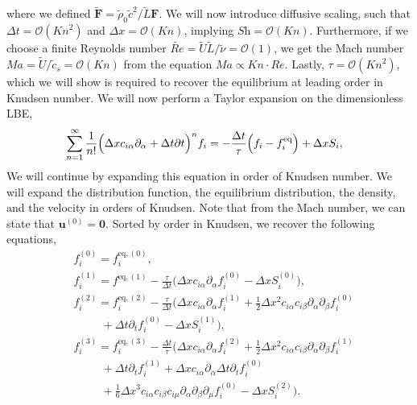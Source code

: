\documentclass[aps,physrev,twocolumn,10pt]{revtex4-2}
\begin{document}
where we defined $\tilde{\bm{F}} = \tilde{\rho}_0 \tilde{c}^2 / \tilde{L} \bm{F}$. We will now introduce diffusive scaling, such that $\Delta t = \mathcal{O}\left(\textit{Kn}^2\right)$ and $\Delta x = \mathcal{O}\left(\textit{Kn}\right)$, implying $\textit{Sh} = \mathcal{O}\left(\textit{Kn}\right)$. Furthermore, if we choose a finite Reynolds number $\tilde{Re} = \tilde{U} \tilde{L} / \tilde{\nu} = \mathcal{O}\left(1\right)$, we get the Mach number $\textit{Ma} = \tilde{U} / \tilde{c}_s = \mathcal{O}\left(\textit{Kn}\right)$ from the equation $\textit{Ma} \propto \textit{Kn}\cdot \textit{Re}$. Lastly, $\tau = \mathcal{O}\left(\textit{Kn}^2\right)$, which we will show is required to recover the equilibrium at leading order in Knudsen number. We will now perform a Taylor expansion on the dimensionless LBE,
\begin{equation}\label{eq:Taylor expansion LBE}
\begin{split}
    &\sum_{n=1}^\infty \frac{1}{n!}\Bigl(\Delta x c_{i\alpha} \partial_\alpha + \Delta t \partial t\Bigr)^n f_i=-\frac{\Delta t}{\tau}\Bigl(f_i  - f^\text{eq}_i\Bigr) + \Delta xS_i,
\end{split}
\end{equation}
We will continue by expanding this equation in order of Knudsen number. We will expand the distribution function, the equilibrium distribution, the density, and the velocity in orders of Knudsen. Note that from the Mach number, we can state that $\bm{u}^{(0)} = \bm{0}$. Sorted by order in Knudsen, we recover the following equations,
\begin{equation}\label{eq:asymptotic expansion lbe}
\begin{split}
    &f_i^{(0)} = f_i^{\text{eq},(0)},\\
    &f_i^{(1)} = f^{\text{eq},(1)} - \frac{\tau}{\Delta t}\Biggl(\Delta x c_{i\alpha}\partial_\alpha f_i^{(0)}-\Delta xS_i^{(0)}\Biggr),\\
    &f_i^{(2)} = f^{\text{eq},(2)}_i - \frac{\tau}{\Delta t}\Biggl(\Delta x c_{i\alpha}\partial_\alpha f_i^{(1)} + \frac{1}{2}\Delta x^2 c_{i\alpha}c_{i\beta}\partial_\alpha\partial_\beta f_i^{(0)}\\
    &\qquad\ \ + \Delta t \partial_t f_i^{(0)} - \Delta xS_i^{(1)}\Biggr),\\
    &f_i^{(3)} = f^{\text{eq},(3)}_i -\frac{\Delta t}{\tau}\Biggl(\Delta x c_{i\alpha}\partial_\alpha f_i^{(2)} + \frac{1}{2}\Delta x^2 c_{i\alpha}c_{i\beta}\partial_\alpha\partial_\beta f_i^{(1)}\\
    &\qquad\ \ + \Delta t \partial_t f_i^{(1)} + \Delta x  c_{i\alpha}\partial_\alpha \Delta t\partial_t f_i^{(0)}\\
    &\qquad\ \  + \frac{1}{6}\Delta x^3 c_{i\alpha}c_{i\beta}c_{i\mu}\partial_\alpha\partial_\beta\partial_\mu f_i^{(0)}-\Delta xS_i^{(2)}\Biggr).\\
\end{split}
\end{equation}
\end{document}
